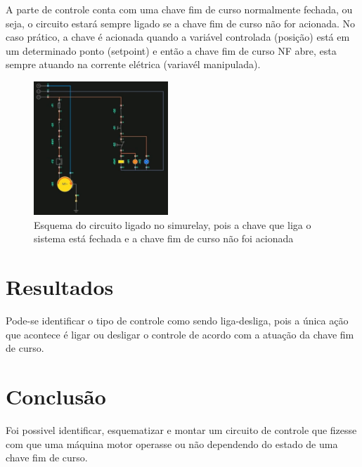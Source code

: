 \documentclass{article}
\begin{document}
A parte de controle conta com uma chave fim de curso normalmente fechada, ou seja, o circuito estará sempre ligado se a chave fim de curso não for acionada. No caso prático, a chave é acionada quando a variável controlada (posição) está em um determinado ponto (setpoint) e então a chave fim de curso NF abre, esta sempre atuando na corrente elétrica (variavél manipulada).

\begin{figure}[h!]
	\centering
        \includegraphics[width=0.45\textwidth]{simurelay1}
	\caption{Esquema do circuito ligado no simurelay, pois a chave que liga o sistema está fechada e a chave fim de curso não foi acionada}
\end{figure}

\section{Resultados}
Pode-se identificar o tipo de controle como sendo liga-desliga, pois a única ação que acontece é ligar ou desligar o controle de acordo com a atuação da chave fim de curso.

\section{Conclusão}
Foi possivel identificar, esquematizar e montar um circuito de controle que fizesse com que uma máquina motor operasse ou não dependendo do estado de uma chave fim de curso.
\end{document}
